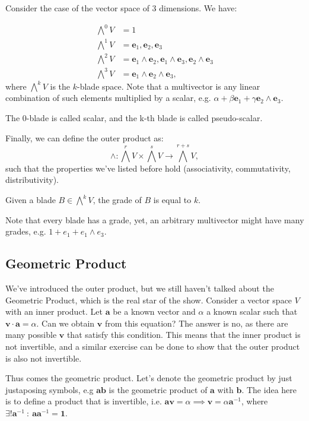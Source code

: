 Consider the case of the vector space of 3 dimensions. We have:

\begin{align}
    \bigwedge^0 V &= 1 \\
    \bigwedge^1 V &= \mathbf e_1, \mathbf e_2, \mathbf e_3\\
    \bigwedge^2 V &= \mathbf e_1\wedge \mathbf e_2, \mathbf e_1 \wedge \mathbf e_3, \mathbf e_2 \wedge \mathbf e_3 \\
    \bigwedge^3 V &= \mathbf e_1\wedge \mathbf e_2 \wedge \mathbf e_3,
\end{align}
where $\bigwedge^k V$ is the $k$-blade space. Note that a multivector is any linear combination of such elements multiplied by a scalar, e.g.
$\alpha + \beta \mathbf e_1 + \gamma \mathbf e_2 \wedge \mathbf e_3$.

The $0$-blade is called scalar, and the k-th blade is called pseudo-scalar.

Finally, we can define the outer product as:
$$
\wedge : \bigwedge^r V \times \bigwedge^s V \to \bigwedge^{r + s} V,
$$
such that the properties we've listed before hold (associativity, commutativity, distributivity).

\begin{definition}[Grade]
    Given a blade $B \in \bigwedge^k V$, the grade of $B$ is equal to $k$.
\end{definition}

Note that every blade has a grade, yet, an arbitrary multivector might have many grades, e.g. $1 + e_1 + e_1\wedge e_3$.

\subsection{Geometric Product}

We've introduced the outer product, but we still haven't talked about the Geometric Product, which is the real star of the show.
Consider a vector space $V$ with an inner product.
Let $\mathbf a$ be a known vector and $\alpha$ a known scalar such that $\mathbf v \cdot \mathbf a = \alpha$. Can we obtain
$\mathbf v$ from this equation? The answer is no, as there are many possible $\mathbf v$ that satisfy this condition. This
means that the inner product is not invertible, and a similar exercise can be done to show that the outer product
is also not invertible.

Thus comes the geometric product. Let's denote the geometric product by just justaposing
symbols, e.g $\mathbf a \mathbf b$ is the geometric product of $\mathbf a$ with $\mathbf b$.
The idea here is to define a product that is invertible, i.e.
$\mathbf a  \mathbf v = \alpha \implies \mathbf v = \alpha  \mathbf a^{-1}$, where $\exists! \mathbf a^{-1} \ : \ \mathbf a  \mathbf a^{-1} = \mathbf 1$.

